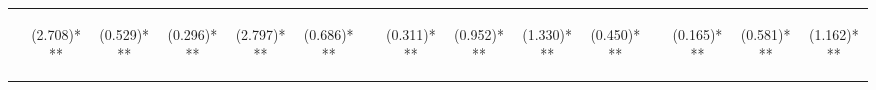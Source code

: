 \begin{center}
\begin{tabular}{lcccccccccccccc}
 & \begin{normalsize}(2.708)***\end{normalsize} & \begin{normalsize}(0.529)***\end{normalsize} & \begin{normalsize}(0.296)***\end{normalsize} & \begin{normalsize}(2.797)***\end{normalsize} & \begin{normalsize}(0.686)***\end{normalsize} & \begin{normalsize}\end{normalsize} & \begin{normalsize}(0.311)***\end{normalsize} & \begin{normalsize}(0.952)***\end{normalsize} & \begin{normalsize}(1.330)***\end{normalsize} & \begin{normalsize}(0.450)***\end{normalsize} & \begin{normalsize}\end{normalsize} & \begin{normalsize}(0.165)***\end{normalsize} & \begin{normalsize}(0.581)***\end{normalsize} & \begin{normalsize}(1.162)***\end{normalsize}\\

\end{tabular}
\end{center}
